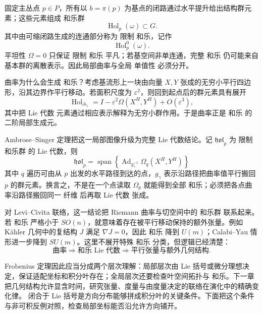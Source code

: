 固定主丛点 $p\in P$，所有以 $b=\pi(p)$ 为基点的闭路通过水平提升给出结构群元素；这些元素组成 和乐群
\[
\operatorname{Hol}_p(\omega)\subset G.
\]
其中由可缩闭路生成的连通部分称为 限制 和乐，记作
\[
\operatorname{Hol}_p^0(\omega).
\]
平坦性 $\Omega=0$ 只保证 限制 和乐 平凡；若基空间非单连通，完整 和乐 仍可能来自基本群的离散表示。因此局部曲率与全局 单值性 必须分开。

曲率为什么会生成 和乐？考虑基流形上一块由向量 $X,Y$ 张成的无穷小平行四边形，沿其边界作平行移动。若面积尺度为 $\varepsilon^2$，则回到起点后的群元素具有展开
\[
\operatorname{Hol}_{\partial\square_\varepsilon}
=I-\varepsilon^2\Omega(X^H,Y^H)+O(\varepsilon^3),
\]
其中把 Lie 代数 元素通过相应表示解释为无穷小群作用。于是曲率正是 和乐 的二阶局部生成元。

Ambrose--Singer 定理把这一局部图像升级为完整 Lie 代数结论。记 $\mathfrak{hol}_p$ 为 限制 和乐群 的 Lie 代数，则
\begin{equation*}{
\mathfrak{hol}_p
=\operatorname{span}
\left\{
\operatorname{Ad}_{g_\gamma^{-1}}
\Omega_q(X^H,Y^H)
\right\}
}\end{equation*}
其中 $q$ 遍历可由从 $p$ 出发的水平路径到达的点，$g_\gamma$ 表示沿路径把曲率值平行搬回 $p$ 的群元素。换言之，不是在一个点读取 $\Omega_p$ 就能得到全部 和乐；必须把各点曲率沿路径搬回同一 纤维 后再取 Lie 代数 张成。

对 Levi--Civita 联络，这一结论把 Riemann 曲率与切空间中的 和乐群 联系起来。若 和乐 严格小于 $SO(n)$，就意味着存在被平行移动保持的额外张量。例如 Kähler 几何中的复结构 $J$ 满足 $\nabla J=0$，因此 和乐 降到 $U(m)$；Calabi--Yau 情形进一步降到 $SU(m)$。这里不展开特殊 和乐 分类，但逻辑已经清楚：
\[
\text{曲率}
\Longrightarrow
\text{和乐 Lie 代数}
\Longrightarrow
\text{平行张量与额外几何结构}.
\]

Frobenius 定理因此应当分成两个层次理解：局部层次由 Lie 括号或微分理想决定，保证适配坐标和积分叶存在；全局层次还要检查叶空间拓扑与 和乐。下一章把几何结构允许显含时间，研究张量、度量与由度量决定的联络在演化中的精确变化律。
闭合于 Lie 括号是方向分布能够拼成积分叶的关键条件。下面把这个条件与非可积反例对照，检查局部坐标能否沿允许方向铺开。




